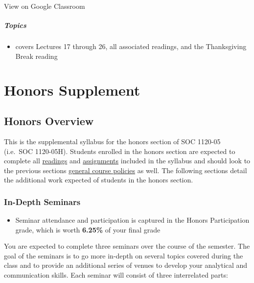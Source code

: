 \documentclass[]{book}
\providecommand{\tightlist}{%
  \setlength{\itemsep}{0pt}\setlength{\parskip}{0pt}}
\newenvironment{rmdblock}[1]
  {\begin{shaded*}
  \begin{itemize}
  \renewcommand{\labelitemi}{
    \raisebox{-.7\height}[0pt][0pt]{
      {\setkeys{Gin}{width=3em,keepaspectratio}\texttt{[image: images/\#1]}}
    }
  }
  \item
  }
  {
  \end{itemize}
  \end{shaded*}
  }
\newenvironment{rmdtip}
  {\begin{rmdblock}{tip}}
  {\end{rmdblock}}
\theoremstyle{definition}
\theoremstyle{definition}
\theoremstyle{definition}
\theoremstyle{remark}
\begin{document}
View on Google Classroom

\hypertarget{topics-31}{%
\subsubsection*{Topics}\label{topics-31}}

\begin{itemize}
\tightlist
\item
  covers Lectures 17 through 26, all associated readings, and the
  Thanksgiving Break reading
\end{itemize}

\hypertarget{part-honors-supplement}{%
\part{Honors Supplement}\label{part-honors-supplement}}

\hypertarget{honors-overview}{%
\chapter{Honors Overview}\label{honors-overview}}

This is the supplemental syllabus for the honors section of SOC 1120-05
(i.e.~SOC 1120-05H). Students enrolled in the honors section are
expected to complete all \href{/lecture-schedule.html}{readings} and
\href{/assignments-and-grading.html}{assignments} included in the
syllabus and should look to the previous sections
\href{/course-policies.html}{general course policies} as well. The
following sections detail the additional work expected of students in
the honors section.

\hypertarget{in-depth-seminars}{%
\section{In-Depth Seminars}\label{in-depth-seminars}}

\begin{rmdtip}
Seminar attendance and participation is captured in the Honors
Participation grade, which is worth \textbf{6.25\%} of your final grade
\end{rmdtip}

You are expected to complete three seminars over the course of the
semester. The goal of the seminars is to go more in-depth on several
topics covered during the class and to provide an additional series of
venues to develop your analytical and communication skills. Each seminar
will consist of three interrelated parts:
\end{document}
